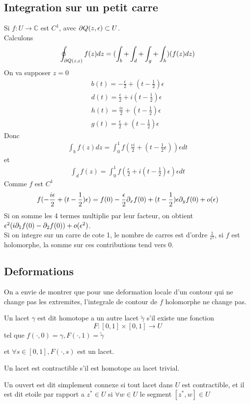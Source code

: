 \documentclass[../main.tex]{subfiles}
\begin{document}
\subsection{Integration sur un petit carre}
Si $f: U \to \mathbb{C}$ est $C^{1}$, avec $\partial Q( z,\epsilon) \subset  U$.\\
Calculons
\begin{align*}
	\oint_{\partial Q( z,\epsilon) } f( z) dz = ( \int_b + \int_d + \int_g + \int_h ) ( f( z) dz) 
\end{align*}
On va supposer $z=0$ 
\begin{align*}
b( t) = -\frac{\epsilon}{2}+ ( t-\frac{1}{2}) \epsilon\\
d( t) = \frac{\epsilon}{2}+ i ( t-\frac{1}{2}) \epsilon\\
h( t) = \frac{i\epsilon}{2}+ ( t-\frac{1}{2}) \epsilon\\
g( t) = \frac{\epsilon}{2} + ( t-\frac{1}{2}) \epsilon
\end{align*}
Donc
\begin{align*}
	\int_b f( z) dz= \int_{ 0 }^{ 1 }f( \frac{\epsilon i }{2} + ( t-\frac{1}{2}\epsilon))\epsilon dt
\end{align*}
et
\begin{align*}
	\int_{ d }^{  }f( z) = \int_{ 0 }^{ 1 }f ( \frac{\epsilon}{2}+ i ( t-\frac{1}{2}) \epsilon) \epsilon dt
\end{align*}
Comme $f$ est $C^{1}$ 
\[ 
	f( - \frac{i\epsilon}{2}+ ( t-\frac{1}{2}) \epsilon) = f( 0) - \frac{\epsilon}{2}\partial_xf( 0) + ( t-\frac{1}{2}) \epsilon \partial_y f( 0) + o ( \epsilon) 
\]
Si on somme les 4 termes multiplie par leur facteur, on obtient $\epsilon^{2}  ( i \partial_1 f( 0) - \partial_2f( 0) )+ o( \epsilon^{2}) $.\\
Si on integre sur un carre de cote 1, le nombre de carres est d'ordre $\frac{1}{\epsilon^{2}}$, si $f$ est holomorphe, la somme sur ces contributions tend vers 0.
\subsection{Deformations}
On a envie de montrer que pour une deformation locale d'un contour qui ne change pas les extremites, l'integrale de contour de $f$ holomorphe ne change pas.
\begin{defn}[Homotopie]
	Un lacet $\gamma$ est dit homotope a un autre lacet $\tilde \gamma$ s'il existe une fonction
	\[ 
	F: [ 0,1] \times [ 0,1] \to U
	\]
	tel que $f( \cdot,0) =\gamma, F( \cdot, 1) =\tilde\gamma$ 
\end{defn}
et $\forall s \in [ 0,1] , F( \cdot, s) $ est un lacet.
\begin{defn}[Contractable]
	Un lacet est contractible s'il est homotope au lacet trivial.
\end{defn}
\begin{defn}
	Un ouvert est dit simplement connexe si tout lacet dans $U$ est contractible, et il est dit etoile par rapport a $z^{*}\in U$ si $\forall w \in U$ le segment $[z^{*},w] \in U$ 	
\end{defn}

	
\end{document}

